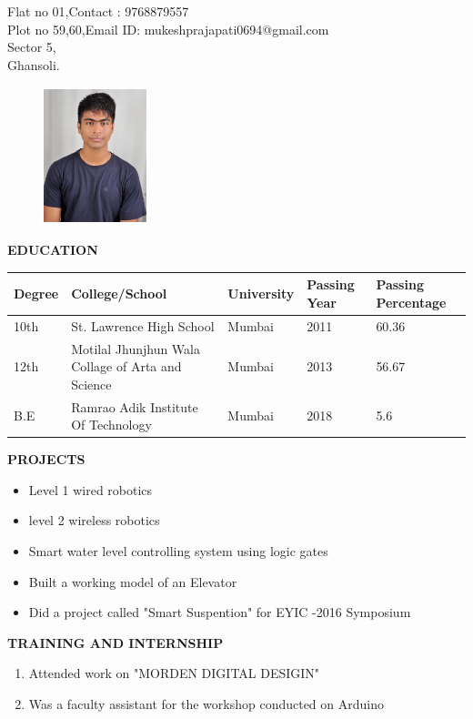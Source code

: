 \documentclass[a4paper]{article}
\begin{document}




\begin{flushleft}
{Flat no 01,\hfill{Contact : 9768879557} \\Plot no 59,60,\hfill{Email ID: mukeshprajapati0694@gmail.com}\\ Sector 5, \\Ghansoli.}
\end{flushleft}


\begin{figure}[h]
\begin{flushright}
\graphicspath{ {images/} }
\includegraphics[width=3cm, height=4cm]{cv_pic}
\end{flushright}
\end{figure}

\begin{flushleft}
\textbf { EDUCATION}
\begin{center}
\begin{tabular}{ | m{2cm} | m{2.5cm}| m{2cm} | m{2.5cm}| m{3cm} | } 
\hline
Degree& College/School & University & Passing Year & Passing Percentage \\ 
\hline
10th  & St. Lawrence High School & Mumbai & 2011 & 60.36 \\ 
\hline
12th & Motilal Jhunjhun Wala Collage of Arta and Science & Mumbai & 2013 & 56.67 \\ 
\hline
B.E & Ramrao Adik Institute Of Technology & Mumbai & 2018 & 5.6 \\

\hline
\end{tabular}
\end{center}
\end{flushleft}


\begin{flushleft}
\textbf {PROJECTS}\\
\begin{itemize}
\item Level 1 wired robotics
\item level 2 wireless robotics
\item Smart water level controlling system using logic gates
\item Built a working model of an Elevator
\item Did a project called "Smart Suspention" for EYIC -2016 Symposium
\end{itemize}
\end{flushleft}

\begin{flushleft}
\textbf {TRAINING AND INTERNSHIP}\\
\begin{enumerate}
\item Attended work on "MORDEN DIGITAL DESIGIN" 
\item Was a faculty assistant for the workshop conducted on Arduino
\end{enumerate}
\end{flushleft}
\end{document}
